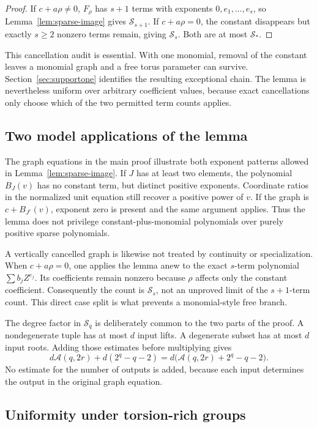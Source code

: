 \documentclass[11pt]{article}
\theoremstyle{definition}
\newcommand{\Acal}{\mathcal A}
\newcommand{\Scal}{\mathcal S}
\begin{document}
\begin{proof}
If \(c+a\rho\neq0\), \(F_\rho\) has \(s+1\) terms with exponents \(0,e_1,\ldots,e_s\), so Lemma~\ref{lem:sparse-image} gives \(\Scal_{s+1}\). If \(c+a\rho=0\), the constant disappears but exactly \(s\geq2\) nonzero terms remain, giving \(\Scal_s\). Both are at most \(\Scal_*\).
\end{proof}

This cancellation audit is essential. With one monomial, removal of the constant leaves a monomial graph and a free torus parameter can survive. Section~\ref{sec:supportone} identifies the resulting exceptional chain. The lemma is nevertheless uniform over arbitrary coefficient values, because exact cancellations only choose which of the two permitted term counts applies.


\subsection{Two model applications of the lemma}

The graph equations in the main proof illustrate both exponent patterns allowed in Lemma~\ref{lem:sparse-image}. If \(J\) has at least two elements, the polynomial \(B_J(v)\) has no constant term, but distinct positive exponents. Coordinate ratios in the normalized unit equation still recover a positive power of \(v\). If the graph is \(c+B_{J^c}(v)\), exponent zero is present and the same argument applies. Thus the lemma does not privilege constant-plus-monomial polynomials over purely positive sparse polynomials.

A vertically cancelled graph is likewise not treated by continuity or specialization. When \(c+a\rho=0\), one applies the lemma anew to the exact \(s\)-term polynomial \(\sum b_jZ^{e_j}\). Its coefficients remain nonzero because \(\rho\) affects only the constant coefficient. Consequently the count is \(\Scal_s\), not an unproved limit of the \(s+1\)-term count. This direct case split is what prevents a monomial-style free branch.

The degree factor in \(\Scal_q\) is deliberately common to the two parts of the proof. A nondegenerate tuple has at most \(d\) input lifts. A degenerate subset has at most \(d\) input roots. Adding those estimates before multiplying gives
\[
 d\Acal(q,2r)+d(2^q-q-2)
 =d\bigl(\Acal(q,2r)+2^q-q-2\bigr).
\]
No estimate for the number of outputs is added, because each input determines the output in the original graph equation.

\subsection{Uniformity under torsion-rich groups}
\end{document}
